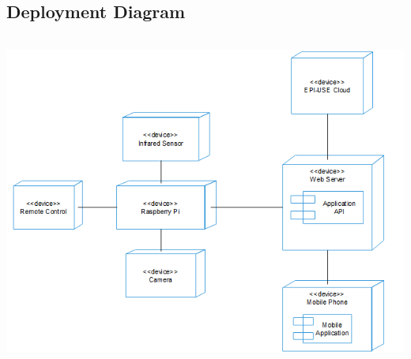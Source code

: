 \documentclass{article}
\begin{document}
\subsection{Deployment Diagram}
\includegraphics[width=20cm,height=11cm,keepaspectratio]{DeploymentDiagram.png} \\
\end{document}

